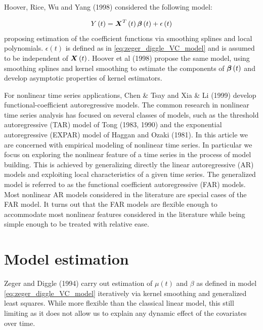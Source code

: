 \documentclass[12pt]{article}
\newcommand*\needsparaphrased{\color{red}}
\newcommand{\bfbeta}{\mbox{\boldmath $\beta$}}
\newcommand{\bfX}{\mbox{\boldmath $X$}}
\begin{document}
Hoover, Rice, Wu and Yang (1998) considered the following model:

\begin{equation} \label{eq:hoover_rice_wu_VC_model}
Y\left(t\right) =  \bfX^T\left(t\right)\bfbeta \left(t\right) + \epsilon\left(t\right) 
\end{equation}
\noindent
proposing estimation of the coefficient functions via smoothing splines and local polynomials. $\epsilon\left(t\right)$ is defined as in \ref{eq:zeger_diggle_VC_model} and is assumed to be independent of $\bfX\left(t\right)$. Hoover et al (1998) propose the same model, using smoothing splines and kernel smoothing to estimate  the components of $\bfbeta\left(t\right)$ and develop asymptotic properties of kernel estimators. 



For nonlinear time series applications, Chen \& Tsay \cite{chen1993functional} and Xia \& Li (1999) develop functional-coefficient autoregressive models. The common research in nonlinear time series analysis has focused on several classes of models, such as the threshold autoregressive (TAR) model of Tong (1983, 1990) and the exponential autoregressive (EXPAR) model of Haggan and Ozaki (1981). {\needsparaphrased In this article we are concerned with empirical modeling of nonlinear time series. In particular we focus on exploring the nonlinear feature of a time series in the process of model building. This is achieved by generalizing directly the linear autoregressive (AR) models and exploiting local characteristics of a given time series. The generalized model is referred to as the functional coefficient autoregressive (FAR) models. Most nonlinear AR models considered in the literature are special cases of the FAR model. It turns out that the FAR models are flexible enough to accommodate most nonlinear features considered in the literature while being simple enough to be treated with relative ease. }


\section{Model estimation}

Zeger and Diggle (1994) carry out estimation of $\mu\left(t\right)$ and $\beta$ as defined in model \ref{eq:zeger_diggle_VC_model} iteratively via kernel smoothing and generalized least squares. While more flexible than the classical linear model, this still limiting as it does not allow us to explain any dynamic effect of the covariates over time.  
\end{document}
